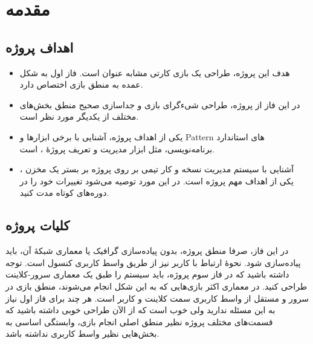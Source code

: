 \documentclass[]{article}
\begin{document}
\newpage

\section*{{\titr مقدمه}}

\subsection*{{\titr اهداف پروژه}}


\begin{itemize}

\item
هدف این پروژه، طراحی یک بازی کارتی مشابه عنوان  است. فاز اول به شکل عمده به منطق بازی اختصاص دارد.


\item
در این فاز از پروژه، طراحی شی‌ءگرای بازی و جداسازی صحیح منطق بخش‌های مختلف از یکدیگر مورد نظر است.

\item
یکی از اهداف پروژه، آشنایی با برخی ابزارها و Pattern های استاندارد برنامه‌نویسی، مثل ابزار مدیریت و تعریف پروژه‌ٔ 
\href{https://en.wikipedia.org/wiki/Apache_Maven}{\textcolor{blue}{\underline{}}}، 
است.

\item
آشنایی با سیستم مدیریت نسخه  و کار تیمی بر روی پروژه بر بستر یک مخزن ، یکی از اهداف مهم پروژه است. در این مورد توصیه می‌شود تغییرات خود را در دوره‌های کوتاه مدت  کنید.

\end{itemize}

\subsection*{{\titr کلیات پروژه}}

در این فاز، صرفا منطق پروژه، بدون پیاده‌سازی گرافیک یا معماری شبکهٔ آن، باید پیاده‌سازی شود. نحوهٔ ارتباط با کاربر نیز از طریق واسط کاربری کنسول است. توجه داشته باشید که در فاز سوم پروژه، باید سیستم را طبق یک معماری سرور-کلاینت طراحی کنید. در معماری اکثر بازی‌هایی که به این شکل انجام می‌شوند، منطق بازی در سرور و مستقل از واسط کاربری سمت کلاینت و کاربر است. هر چند برای فاز اول نیاز به این مسئله ندارید ولی خوب‌ است که از الآن طراحی خوبی داشته باشید که قسمت‌های مختلف پروژه نظیر منطق اصلی انجام بازی، وابستگی اساسی به بخش‌هایی نظیر واسط کاربری نداشته باشد.
\end{document}
